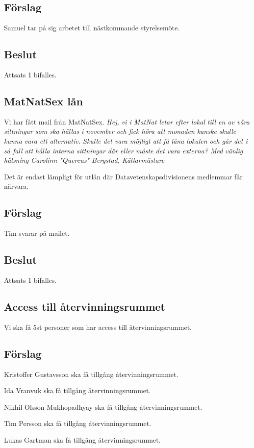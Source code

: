 \documentclass[protokoll]{dvd}
\begin{document}
\subsection{Förslag}
\begin{attsatser}
    \item Samuel tar på sig arbetet till nästkommande styrelsemöte.
\end{attsatser}
\subsection{Beslut}
Attsats 1 bifalles.

\subsection*{MatNatSex lån}
Vi har fått mail från MatNatSex.
\textit{Hej, vi i MatNat letar efter lokal till en av våra sittningar som ska hållas i november och fick höra att monaden kanske skulle kunna vara ett alternativ. Skulle det vara möjligt att få låna lokalen och går det i så fall att hålla interna sittningar där eller måste det vara externa?
Med vänlig hälsning
Carolinn "Quercus" Bergstad, Källarmästare}

Det är endast lämpligt för utlån där Datavetenskapsdivisionens medlemmar får närvara.
\subsection{Förslag}
\begin{attsatser}
    \item Tim svarar på mailet. 
\end{attsatser}
\subsection{Beslut}
Attsats 1 bifalles.

\subsection*{Access till återvinningsrummet}
Vi ska få 5st personer som har access till återvinningsrummet.

\subsection{Förslag}
\begin{attsatser}
    \item Kristoffer Gustavsson ska få tillgång återvinningsrummet.
    \item Ida Vranvuk ska få tillgång återvinningsrummet.
    \item Nikhil Olsson Mukhopadhyay ska få tillgång återvinningsrummet.
    \item Tim Persson ska få tillgång återvinningsrummet.
    \item Lukas Gartman ska få tillgång återvinningsrummet.
\end{attsatser}
\end{document}
